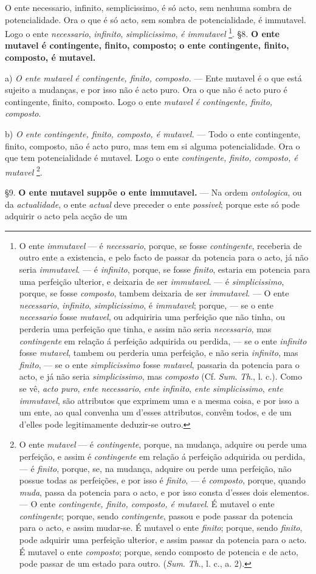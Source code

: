  O ente necessario, infinito, semplicissimo, é só acto, sem nenhuma sombra de potencialidade. Ora o que é só acto, sem sombra de potencialidade, é immutavel. Logo o ente \emph{necessario}, \emph{infinito}, \emph{simplicissimo}, \emph{é immutavel} \footnote{O ente \emph{immutavel} --- é \emph{necessario}, porque, se fosse \emph{contingente}, receberia de outro ente a existencia, e pelo facto de passar da potencia para o acto, já não seria \emph{immutavel}. --- é \emph{infinito}, porque, se fosse \emph{finito}, estaria em potencia para uma perfeição ulterior, e deixaria de ser \emph{immutavel}. --- é \emph{simplicissimo}, porque, se fosse \emph{composto}, tambem deixaria de ser \emph{immutavel}. --- O ente \emph{necessario}, \emph{infinito}, \emph{simplicissimo}, é \emph{immutavel}; porque, --- se o ente \emph{necessario} fosse \emph{mutavel}, ou adquiriria uma perfeição que não tinha, ou perderia uma perfeição que tinha, e assim não seria \emph{necessario}, mas \emph{contingente} em relação á perfeição adquirida ou perdida, --- se o ente \emph{infinito} fosse \emph{mutavel}, tambem ou perderia uma perfeição, e não seria \emph{infinito}, mas \emph{finito}, --- se o ente \emph{simplicissimo} fosse \emph{mutavel}, passaria da potencia para o acto, e já não seria \emph{simplicissimo}, mas \emph{composto} (Cf. \emph{Sum}. \emph{Th}., l. c.). Como se vê, \emph{acto puro}, \emph{ente necessario}, \emph{ente infinito}, \emph{ente simplicissimo}, \emph{ente immutavel}, são attributos que exprimem uma e a mesma coisa, e por isso a um ente, ao qual convenha um d'esses attributos, convêm todos, e de um d'elles pode legitimamente deduzir-se outro.}. §8. \textbf{O ente mutavel é contingente, finito, composto; o ente contingente, finito, composto, é mutavel.}

a) \emph{O ente mutavel é contingente, finito, composto.} --- Ente mutavel é o que está sujeito a mudanças, e por isso não é acto puro. Ora o que não é acto puro é contingente, finito, composto. Logo o ente \emph{mutavel é contingente, finito, composto}.

b) \emph{O ente contingente, finito, composto, é mutavel.} --- Todo o ente contingente, finito, composto, não é acto puro, mas tem em si alguma potencialidade. Ora o que tem potencialidade é mutavel. Logo o ente \emph{contingente, finito, composto, é mutavel} \footnote{O ente \emph{mutavel} --- é \emph{contingente}, porque, na mudança, adquire ou perde uma perfeição, e assim é \emph{contingente} em relação á perfeição adquirida ou perdida, --- é \emph{finito}, porque, se, na mudança, adquire ou perde uma perfeição, não possue todas as perfeições, e por isso é \emph{finito}, --- é \emph{composto}, porque, quando \emph{muda}, passa da potencia para o acto, e por isso consta d'esses dois elementos. --- O ente \emph{contingente, finito, composto, é mutavel}. É mutavel o ente \emph{contingente}; porque, sendo \emph{contingente}, passou e pode passar da potencia para o acto, e assim mudar-se. É mutavel o ente \emph{finito}; porque, sendo \emph{finito}, pode adquirir uma perfeição ulterior, e assim passar da potencia para o acto. É mutavel o ente \emph{composto}; porque, sendo composto de potencia e de acto, pode passar de um estado para outro. (\emph{Sum}. \emph{Th}., l. c., a. 2).}.

§9. \textbf{O ente mutavel suppõe o ente immutavel.} --- Na ordem \emph{ontologica}, ou da \emph{actualidade}, o ente \emph{actual} deve preceder o ente \emph{possivel}; porque este só pode adquirir o acto pela acção de um